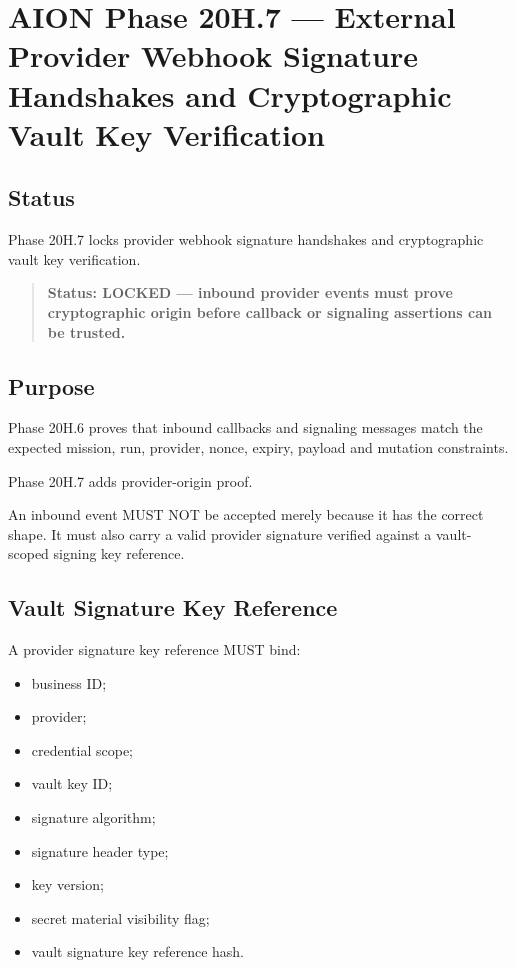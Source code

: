 \section{AION Phase 20H.7 --- External Provider Webhook Signature Handshakes and Cryptographic Vault Key Verification}
\label{sec:aion-phase20h7-provider-webhook-signature-verification}

\subsection{Status}

Phase 20H.7 locks provider webhook signature handshakes and cryptographic vault key verification.

\begin{quote}
\textbf{Status: LOCKED --- inbound provider events must prove cryptographic origin before callback or signaling assertions can be trusted.}
\end{quote}

\subsection{Purpose}

Phase 20H.6 proves that inbound callbacks and signaling messages match the expected mission, run, provider, nonce, expiry, payload and mutation constraints.

Phase 20H.7 adds provider-origin proof.

An inbound event MUST NOT be accepted merely because it has the correct shape. It must also carry a valid provider signature verified against a vault-scoped signing key reference.

\subsection{Vault Signature Key Reference}

A provider signature key reference MUST bind:

\begin{itemize}
  \item business ID;
  \item provider;
  \item credential scope;
  \item vault key ID;
  \item signature algorithm;
  \item signature header type;
  \item key version;
  \item secret material visibility flag;
  \item vault signature key reference hash.
\end{itemize}


